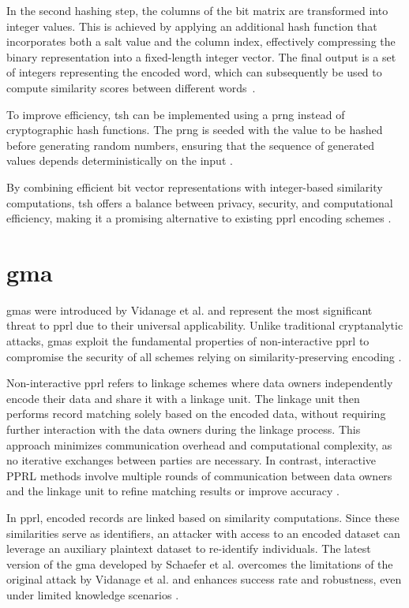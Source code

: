 In the second hashing step, the columns of the bit matrix are transformed into integer values.
This is achieved by applying an additional hash function that incorporates both a salt value and the column index, effectively compressing the binary representation into a fixed-length integer vector.
The final output is a set of integers representing the encoded word, which can subsequently be used to compute similarity scores between different words~\cite{ranbaduge2020secure}.

To improve efficiency, \ac{tsh} can be implemented using a \ac{prng} instead of cryptographic hash functions.
The \ac{prng} is seeded with the value to be hashed before generating random numbers, ensuring that the sequence of generated values depends deterministically on the input \cite{ranbaduge2020secure}.

By combining efficient bit vector representations with integer-based similarity computations, \ac{tsh} offers a balance between privacy, security, and computational efficiency, making it a promising alternative to existing \ac{pprl} encoding schemes \cite{vidanage2020graph, ranbaduge2020secure}.

\section{\ac{gma}} \label{sec:gma}

\ac{gma}s  were introduced by Vidanage et al. \cite{vidanage2020graph} and represent the most significant threat to \ac{pprl} due to their universal applicability.
Unlike traditional cryptanalytic attacks, \ac{gma}s exploit the fundamental properties of non-interactive \ac{pprl} to compromise the security of all schemes relying on similarity-preserving encoding \cite{schaefer2024}.


Non-interactive \ac{pprl} refers to linkage schemes where data owners independently encode their data and share it with a linkage unit.
The linkage unit then performs record matching solely based on the encoded data, without requiring further interaction with the data owners during the linkage process.
This approach minimizes communication overhead and computational complexity, as no iterative exchanges between parties are necessary.
In contrast, interactive PPRL methods involve multiple rounds of communication between data owners and the linkage unit to refine matching results or improve accuracy \cite{kum2014privacy}.

In \ac{pprl}, encoded records are linked based on similarity computations.
Since these similarities serve as identifiers, an attacker with access to an encoded dataset can leverage an auxiliary plaintext dataset to re-identify individuals.
The latest version of the \ac{gma} developed by Schaefer et al. \cite{schaefer2024} overcomes the limitations of the original attack by Vidanage et al. \cite{vidanage2020graph} and enhances success rate and robustness, even under limited knowledge scenarios \cite{schaefer2024}.

